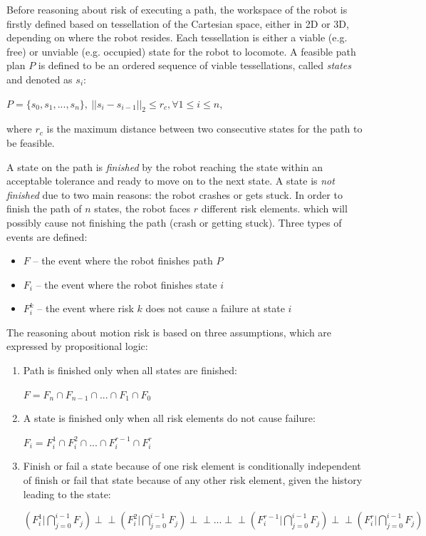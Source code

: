 \documentclass[letterpaper]{article} %
\begin{document}
Before reasoning about risk of executing a path, the workspace of the robot is firstly defined based on tessellation of the Cartesian space, either in 2D or 3D, depending on where the robot resides. Each tessellation is either a viable (e.g. free) or unviable (e.g. occupied) state for the robot to locomote. A feasible path plan $P$ is defined to be an ordered sequence of viable tessellations, called \emph{states} and denoted as $s_i$:

\begin{center}
$P = \{s_0, s_1, ..., s_n\},~|| s_i - s_{i-1}||_2 \leq r_c, \forall 1 \leq i \leq n$,
\end{center}

where $r_c$ is the maximum distance between two consecutive states for the path to be feasible.

A state on the path is \emph{finished} by the robot reaching the state within an acceptable tolerance and ready to move on to the next state. A state is \emph{not finished} due to two main reasons: the robot crashes or gets stuck. In order to finish the path of $n$ states, the robot faces $r$ different risk elements. which will possibly cause not finishing the path (crash or getting stuck). Three types of events are defined:

\begin{itemize}
\item $F$ -- the event where the robot finishes path $P$
\item $F_i$ -- the event where the robot finishes state $i$
\item $F_i^k$ -- the event where risk $k$ does not cause a failure at state $i$
\end{itemize}

The reasoning about motion risk is based on three assumptions, which are expressed by propositional logic:
\begin{enumerate}
	\item Path is finished only when all states are finished:
	\begin{center}
	$F = F_n \cap F_{n-1} \cap ... \cap F_1 \cap F_0$
	\end{center}

	\item A state is finished only when all risk elements do not cause failure:
	\begin{center}
	$F_i = F_i^1 \cap F_i^2 \cap ... \cap F_i^{r-1} \cap F_i^r$
	\end{center}

	\item Finish or fail a state because of one risk element is conditionally independent of finish or fail that state because of any other risk element, given the history leading to the state:
	\begin{center}
	$(F_i^1 \vert \bigcap \limits_{j=0}^{i-1} F_j) \perp \!\!\! \perp (F_i^2 \vert \bigcap \limits_{j=0}^{i-1} F_j) \perp \!\!\! \perp ... \perp \!\!\! \perp (F_i^{r-1} \vert \bigcap \limits_{j=0}^{i-1} F_j) \perp \!\!\! \perp (F_i^r \vert \bigcap \limits_{j=0}^{i-1} F_j)$
	\end{center}
\end{enumerate}
\end{document}
